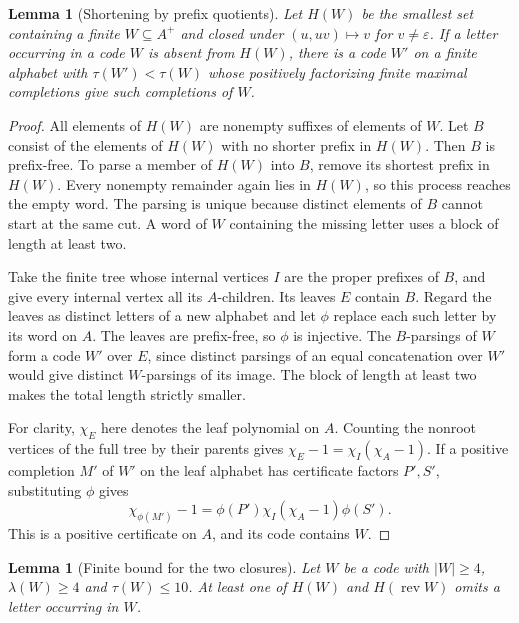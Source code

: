\documentclass[11pt,a4paper]{article}
\newtheorem{lemma}[theorem]{Lemma}
\newcommand{\eps}{\varepsilon}
\DeclareMathOperator{\rev}{rev}
\begin{document}
\begin{lemma}[Shortening by prefix quotients]\label{lem:shortening}
Let $H(W)$ be the smallest set containing a finite $W\subseteq A^+$ and closed under
$(u,uv)\mapsto v$ for $v\ne\eps$. If a letter occurring in a code $W$ is absent from $H(W)$, there
is a code $W'$ on a finite alphabet with $\tau(W')<\tau(W)$ whose positively factorizing finite
maximal completions give such completions of $W$.
\end{lemma}

\begin{proof}
All elements of $H(W)$ are nonempty suffixes of elements of $W$. Let $B$ consist of the elements
of $H(W)$ with no shorter prefix in $H(W)$. Then $B$ is prefix-free. To parse a member of $H(W)$
into $B$, remove its shortest prefix in $H(W)$. Every nonempty remainder again lies in $H(W)$, so
this process reaches the empty word. The parsing is unique because distinct elements of $B$
cannot start at the same cut. A word of $W$ containing the missing letter uses a block of length
at least two.

Take the finite tree whose internal vertices $I$ are the proper prefixes of $B$, and give every
internal vertex all its $A$-children. Its leaves $E$ contain $B$. Regard the leaves as distinct
letters of a new alphabet and let $\phi$ replace each such letter by its word on $A$. The leaves
are prefix-free, so $\phi$ is injective. The $B$-parsings of $W$ form a code $W'$ over $E$, since
distinct parsings of an equal concatenation over $W'$ would give distinct $W$-parsings of its
image. The block of length at least two makes the total length strictly smaller.

For clarity, $\chi_E$ here denotes the leaf polynomial on $A$. Counting the nonroot vertices of the
full tree by their parents gives $\chi_E-1=\chi_I(\chi_A-1)$. If a positive completion $M'$ of
$W'$ on the leaf alphabet has certificate factors $P',S'$, substituting $\phi$ gives
\[
  \chi_{\phi(M')}-1=\phi(P')\chi_I(\chi_A-1)\phi(S').
\]
This is a positive certificate on $A$, and its code contains $W$.
\end{proof}

\begin{lemma}[Finite bound for the two closures]\label{lem:closures}
Let $W$ be a code with $|W|\ge4$, $\lambda(W)\ge4$ and $\tau(W)\le10$. At least one of $H(W)$ and
$H(\rev W)$ omits a letter occurring in $W$.
\end{lemma}
\end{document}
